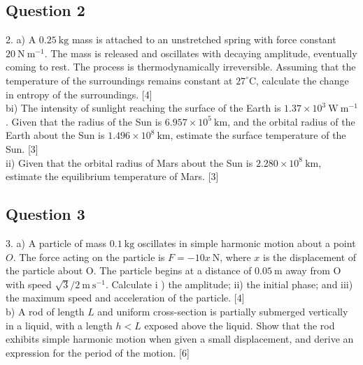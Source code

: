 \documentclass{article}
\begin{document}
\subsection{Question 2}
2. a) A $0.25 \mathrm{~kg}$ mass is attached to an unstretched spring with force constant $20 \mathrm{~N} \mathrm{~m}^{-1}$. The mass is released and oscillates with decaying amplitude, eventually coming to rest. The process is thermodynamically irreversible. Assuming that the temperature of the surroundings remains constant at $27^{\circ} \mathrm{C}$, calculate the change in entropy of the surroundings. [4] \\
bi) The intensity of sunlight reaching the surface of the Earth is $1.37 \times 10^{3} \mathrm{~W} \mathrm{~m}^{-1}$. Given that the radius of the Sun is $6.957 \times 10^{5} \mathrm{~km}$, and the orbital radius of the Earth about the Sun is $1.496 \times 10^{8} \mathrm{~km}$, estimate the surface temperature of the Sun. [3] \\
ii) Given that the orbital radius of Mars about the Sun is $2.280 \times 10^{8} \mathrm{~km}$, estimate the equilibrium temperature of Mars. [3]

\subsection{Question 3}
3. a) A particle of mass $0.1 \mathrm{~kg}$ oscillates in simple harmonic motion about a point $O$. The force acting on the particle is $F=-10 x \mathrm{~N}$, where $x$ is the displacement of the particle about $\mathrm{O}$. The particle begins at a distance of $0.05 \mathrm{~m}$ away from $\mathrm{O}$ with speed $\sqrt{3} / 2 \mathrm{~m} \mathrm{~s}^{-1}$. Calculate $\mathrm{i}$ ) the amplitude; ii) the initial phase; and iii) the maximum speed and acceleration of the particle. [4] \\
b) A rod of length $L$ and uniform cross-section is partially submerged vertically in a liquid, with a length $h<L$ exposed above the liquid. Show that the rod exhibits simple harmonic motion when given a small displacement, and derive an expression for the period of the motion. [6]
\end{document}

